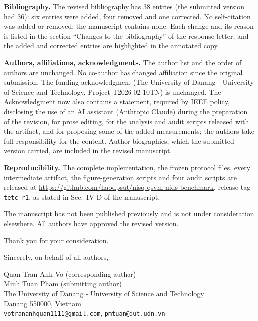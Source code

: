 \documentclass[11pt,a4paper]{article}
\begin{document}
\textbf{Bibliography.} The revised bibliography has 38 entries (the submitted
version had 36): six entries were added, four removed and one corrected. No
self-citation was added or removed; the manuscript contains none. Each change
and its reason is listed in the section ``Changes to the bibliography'' of the
response letter, and the added and corrected entries are highlighted in the
annotated copy.

\textbf{Authors, affiliations, acknowledgments.} The author list and the order
of authors are unchanged. No co-author has changed affiliation since the
original submission. The funding acknowledgment (The University of Danang -
University of Science and Technology, Project T2026-02-10TN) is unchanged.
The Acknowledgment now also contains a statement, required by IEEE policy,
disclosing the use of an AI assistant (Anthropic Claude) during the
preparation of the revision, for prose editing, for the analysis and audit
scripts released with the artifact, and for proposing some of the added
measurements; the authors take full responsibility for the content. Author
biographies, which the submitted version carried, are included in the revised
manuscript.

\textbf{Reproducibility.} The complete implementation, the frozen protocol
files, every intermediate artifact, the figure-generation scripts and four audit
scripts are released at \url{https://github.com/haodpsut/nisq-qsvm-nids-benchmark}, release
tag \texttt{tetc-r1}, as stated in Sec.~IV-D of the manuscript.

The manuscript has not been published previously and is not under
consideration elsewhere. All authors have approved the revised version.

Thank you for your consideration.

\vspace{10pt}
Sincerely, on behalf of all authors,

\vspace{18pt}
Quan Tran Anh Vo (corresponding author)\\
Minh Tuan Pham (submitting author)\\
The University of Danang - University of Science and Technology\\
Danang 550000, Vietnam\\
\texttt{votrananhquan1111@gmail.com}, \texttt{pmtuan@dut.udn.vn}
\end{document}
